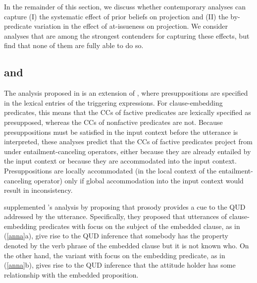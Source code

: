 \documentclass[11pt,fleqn]{article}
\newcommand{\6}{\mbox{$[\hspace*{-.6mm}[$}}
\newcommand{\9}{\mbox{$]\hspace*{-.6mm}]$}}
\newcommand{\citepos}[1]{\citeauthor{#1}'s \citeyear{#1}}
\begin{document}
In the remainder of this section, we discuss whether contemporary analyses can capture (I) the systematic effect of prior beliefs on projection and (II) the by-predicate variation in the effect of at-issueness on projection. We consider analyses that are among the strongest contenders for capturing these effects, but find that none of them are fully able to do so.

\subsection{\citealt{heim83} and \citealt{djaerv-bacovcin2020}}\label{s41}

The analysis proposed in \citealt{djaerv-bacovcin2020} is an extension of \citealt{heim83}, where presuppositions are specified in the lexical entries of the triggering expressions. For clause-embedding predicates, this means that the CCs of factive predicates are lexically specified as presupposed, whereas the CCs of nonfactive predicates are not. Because presuppositions must be satisfied in the input context before the utterance is interpreted, these analyses predict that the CCs of factive predicates project from under entailment-canceling operators, either because they are already entailed by the input context or because they are accommodated into the input context. Presuppositions are locally accommodated (in the local context of the entailment-canceling operator) only if global accommodation into the input context would result in inconsistency.

\citealt{djaerv-bacovcin2020} supplemented \citepos{heim83} analysis by proposing that prosody provides a cue to the QUD addressed by the utterance. Specifically, they proposed that utterances of clause-embedding predicates with focus on the subject of the embedded clause, as in (\ref{anna}a), give rise to the QUD inference that somebody has the property denoted by the verb phrase of the embedded clause but it is not known who. On the other hand, the variant with focus on the embedding predicate, as in (\ref{anna}b), gives rise to the QUD inference that the attitude holder has some relationship with the embedded proposition.
\end{document}
